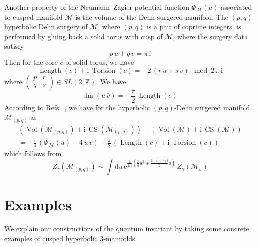 \documentclass[12pt,reqno]{amsart}
\numberwithin{equation}{section}
\DeclareMathOperator{\CS}{CS}
\renewcommand{\Im}{\operatorname{Im}}
\DeclareMathOperator{\Vol}{Vol}
\DeclareMathOperator{\length}{Length}
\DeclareMathOperator{\torsion}{Torsion}
\newcommand{\I}{\mathrm{i}}
\newcommand{\E}{\mathrm{e}}
\begin{document}
Another property of
the Neumann--Zagier potential function $\Phi_{\mathcal{M}}(u)$ associated to
cusped manifold $\mathcal{M}$ is
the volume of the Dehn surgered
manifold.
The $(p,q)$-hyperbolic Dehn surgery of $\mathcal{M}$,
where $(p,q)$ is a pair of coprime integers, is performed by
gluing back a
solid torus with cusp of $\mathcal{M}$, where the surgery data
satisfy~\cite{WPThurs80Lecture}
\begin{equation}
  p \, u+ q \, v =  \pi \, \I
\end{equation}
Then for the core $c$ of solid torus, we have
\begin{equation}
  \length(c) + \I \, \torsion(c)
  =
  - 2\, \left(
    r \, u + s\, v
  \right)
  \mod 2 \, \pi \, \I
\end{equation}
where
$
\begin{pmatrix}
  p & r \\
  q & s
\end{pmatrix}
\in SL(2,\mathbb{Z})$.
We have
\begin{equation}
  \Im \left( u \, \bar{v} \right)
  =
  -\frac{ \pi}{2} \, \length(c)
\end{equation}
According to Refs.~, 
we have for
the hyperbolic $(p,q)$-Dehn surgered manifold $\mathcal{M}_{(p,q)}$
as
\begin{multline}
  \left( \Vol\left(\mathcal{M}_{(p,q)}\right)
    + \I \, \CS \left(\mathcal{M}_{(p,q)} \right) \right)
  -
  \left( \Vol(\mathcal{M}) + \I \, \CS(\mathcal{M}) \right)
  \\
  =
  - \frac{\I}{4} \, \left(
    \Phi_{\mathcal{M}}(u) - 4 \, u \, v
  \right) -
  \frac{\pi}{2} \,
  \left(
    \length(c)
    + \I \, 
    \torsion(c)
  \right)
\end{multline}
which follows from 
\begin{equation}
  Z_\gamma \left( \mathcal{M}_{(p,q)} \right)
  \sim
  \int \mathrm{d} u \,
  \E^{
    \frac{1}{2 \I \gamma}
    \left(
      \frac{p}{q} u^2 +
      \frac{2 ( \pi + \gamma)  \I}{q} u
    \right)
  } \,
  Z_\gamma(\mathcal{M}_u)
\end{equation}

\section{Examples}
\label{sec:example}
We explain our constructions of
the quantum invariant by taking some
concrete examples of cusped hyperbolic 3-manifolds.
\end{document}
